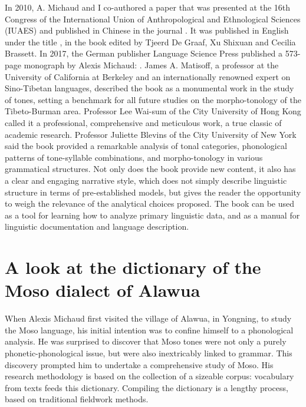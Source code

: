 In 2010, A. Michaud and I co-authored a paper that was presented at the 16th Congress of the International Union of Anthropological and Ethnological Sciences (IUAES) and published in Chinese in the journal . It was published in English under the title , in the book  edited by Tjeerd De Graaf, Xu Shixuan and Cecilia Brassett. In 2017, the German publisher Language Science Press published a 573-page monograph by Alexis Michaud: \emph{}. James A. Matisoff, a professor at the University of California at Berkeley and an internationally renowned expert on Sino-Tibetan languages, described the book as a monumental work in the study of tones, setting a benchmark for all future studies on the morpho-tonology of the Tibeto-Burman area. Professor Lee Wai-sum of the City University of Hong Kong called it a professional, comprehensive and meticulous work, a true classic of academic research. Professor Juliette Blevins of the City University of New York said the book provided a remarkable analysis of tonal categories, phonological patterns of tone-syllable combinations, and morpho-tonology in various grammatical structures. Not only does the book provide new content, it also has a clear and engaging narrative style, which does not simply describe linguistic structure in terms of pre-established models, but gives the reader the opportunity to weigh the relevance of the analytical choices proposed. The book can be used as a tool for learning how to analyze primary linguistic data, and as a manual for linguistic documentation and language description.

\section*{A look at the dictionary of the Moso dialect of Alawua}

When Alexis Michaud first visited the village of Alawua, in Yongning, to study the Moso language, his initial intention was to confine himself to a phonological analysis. He was surprised to discover that Moso tones were not only a purely phonetic-phonological issue, but were also inextricably linked to grammar. This discovery prompted him to undertake a comprehensive study of Moso. His research methodology is based on the collection of a sizeable corpus: vocabulary from texts feeds this dictionary. Compiling the dictionary is a lengthy process, based on traditional fieldwork methods.

